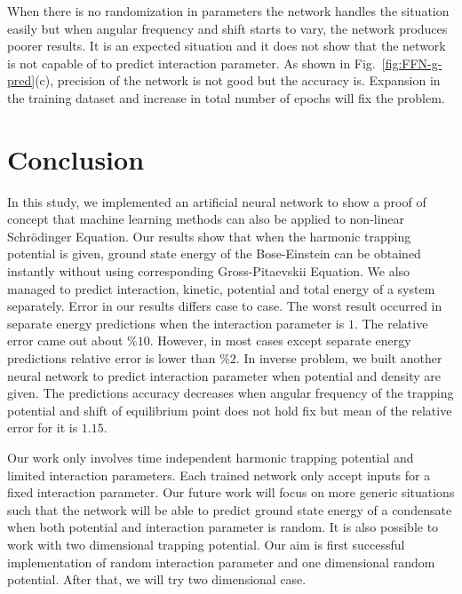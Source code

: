 \documentclass[a4paper,times,12pt]{article}
\begin{document}
When there is no randomization in parameters the network handles the situation easily but when angular frequency and shift starts to vary, the network produces poorer results. It is an expected situation and it does not show that the network is not capable of to predict interaction parameter. As shown in Fig.~\ref{fig:FFN-g-pred}(c), precision of the network is not good but the accuracy is. Expansion in the training dataset and increase in total number of epochs will fix the problem.

\clearpage
\section{Conclusion}

In this study, we implemented an artificial neural network to show a proof of concept that machine learning methods can also be applied to non-linear Schr{\"o}dinger Equation. Our results show that when the harmonic trapping potential is given, ground state energy of the Bose-Einstein can be obtained instantly without using corresponding Gross-Pitaevskii Equation. We also managed to predict interaction, kinetic, potential and total energy of a system separately. Error in our results differs case to case. The worst result occurred in separate energy predictions when the interaction parameter is $1$. The relative error came out about $\%10$. However, in most cases except separate energy predictions relative error is lower than $\%2$. In inverse problem, we built another neural network to predict interaction parameter when potential and density are given. The predictions accuracy decreases when angular frequency of the trapping potential and shift of equilibrium point does not hold fix but mean of the relative error for it is $1.15$.

Our work only involves time independent harmonic trapping potential and limited interaction parameters. Each trained network only accept inputs for a fixed interaction parameter. Our future work will focus on more generic situations such that the network will be able to predict ground state energy of a condensate when both potential and interaction parameter is random. It is also possible to work with two dimensional trapping potential. Our aim is first successful implementation of random interaction parameter and one dimensional random potential. After that, we will try two dimensional case. 

\clearpage




\appendix
\end{document}
